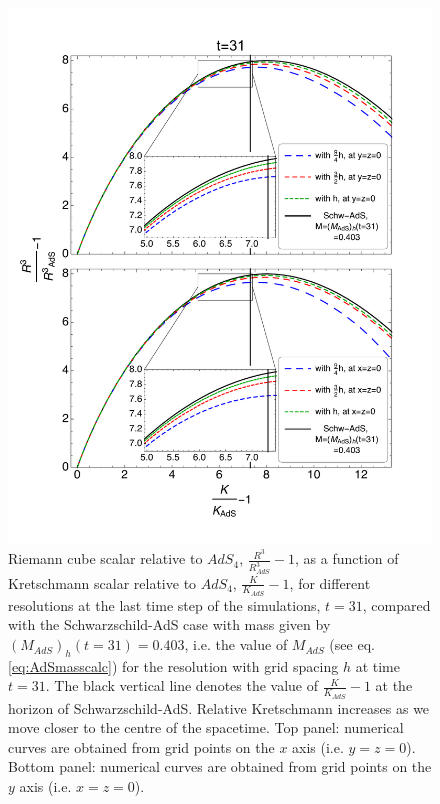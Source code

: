 \documentclass[a4paper,11pt]{article}
\numberwithin{equation}{section}
\begin{document}
\begin{figure}[!h]
        \centering
        \includegraphics[width=5.25in,clip=true]{plots/bulkplots/compare_res/relriemanncube-relkretsch/combined_withzoom_fullplotrelRieCubeofrelkretschallres.pdf}
\parbox{5.0in}{\caption{Riemann cube scalar relative to $AdS_4$, $\frac{R^3}{R^3_{AdS}}-1$, as a function of Kretschmann scalar relative to $AdS_4$, $\frac{K}{K_{AdS}}-1$, for different resolutions at the last time step of the simulations, $t=31$, compared with the Schwarzschild-AdS case with mass given by $(M_{AdS})_h(t=31)=0.403$, i.e. the value of $M_{AdS}$ (see eq. \eqref{eq:AdSmasscalc}) for the resolution with grid spacing $h$ at time $t=31$. The black vertical line denotes the value of $\frac{K}{K_{AdS}}-1$ at the horizon of Schwarzschild-AdS. Relative Kretschmann increases as we move closer to the centre of the spacetime. Top panel: numerical curves are obtained from grid points on the $x$ axis (i.e. $y=z=0$). Bottom panel: numerical curves are obtained from grid points on the $y$ axis (i.e. $x=z=0$).
        }\label{fig:relRiemanncube-relKretschmann-comparison-SchwAdS}}
\end{figure}
\end{document}
